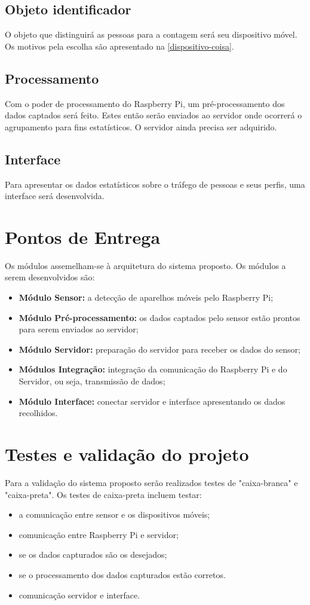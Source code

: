 \subsection{Objeto identificador}
O objeto que distinguirá as pessoas para a contagem será seu dispositivo móvel. Os motivos pela escolha são apresentado na \autoref{dispositivo-coisa}.

\subsection{Processamento}
Com o poder de processamento do Raspberry Pi, um pré-processamento dos dados captados será feito. Estes então serão enviados ao servidor onde
ocorrerá o agrupamento para fins estatísticos. O servidor ainda precisa ser adquirido.

\subsection{Interface}
Para apresentar os dados estatísticos sobre o tráfego de pessoas e seus perfis, uma interface será desenvolvida.

\section{Pontos de Entrega}
\label{pontos-entrega}
Os módulos assemelham-se à arquitetura do sistema proposto. Os módulos a serem desenvolvidos são:
\begin{itemize}
  \item \textbf{Módulo Sensor:} a detecção de aparelhos móveis pelo Raspberry Pi;
  \item \textbf{Módulo Pré-processamento:} os dados captados pelo sensor estão prontos para serem enviados ao servidor;
  \item \textbf{Módulo Servidor:} preparação do servidor para receber os dados do sensor;
  \item \textbf{Módulos Integração:} integração da comunicação do Raspberry Pi e do Servidor, ou seja, transmissão de dados;
  \item \textbf{Módulo Interface:} conectar servidor e interface apresentando os dados recolhidos.
\end{itemize}

\section{Testes e validação do projeto}
Para a validação do sistema proposto serão realizados testes de "caixa-branca" e "caixa-preta". Os testes de caixa-preta incluem testar:
\begin{itemize}
  \item a comunicação entre sensor e os dispositivos móveis;
  \item comunicação entre Raspberry Pi e servidor;
  \item se os dados capturados são os desejados;
  \item se o processamento dos dados capturados estão corretos.
  \item comunicação servidor e interface.
\end{itemize}

